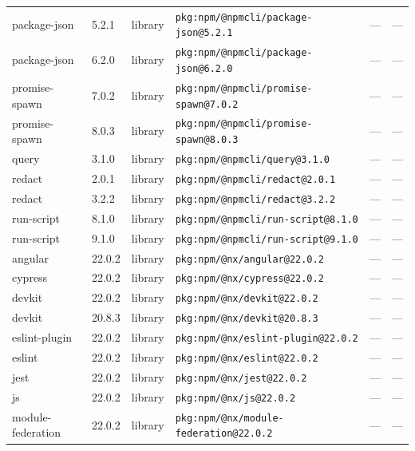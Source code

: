 \documentclass[11pt,a4paper]{article}
\begin{document}
\begin{longtable}{|p{4cm}|p{2cm}|p{1.6cm}|p{5cm}|p{1.5cm}|p{3.5cm}|}
\raggedright package-json & 5.2.1 & library & \small\texttt{pkg:npm/@npmcli/package-json@5.2.1} & — & \small — \\
\raggedright package-json & 6.2.0 & library & \small\texttt{pkg:npm/@npmcli/package-json@6.2.0} & — & \small — \\
\raggedright promise-spawn & 7.0.2 & library & \small\texttt{pkg:npm/@npmcli/promise-spawn@7.0.2} & — & \small — \\
\raggedright promise-spawn & 8.0.3 & library & \small\texttt{pkg:npm/@npmcli/promise-spawn@8.0.3} & — & \small — \\
\raggedright query & 3.1.0 & library & \small\texttt{pkg:npm/@npmcli/query@3.1.0} & — & \small — \\
\raggedright redact & 2.0.1 & library & \small\texttt{pkg:npm/@npmcli/redact@2.0.1} & — & \small — \\
\raggedright redact & 3.2.2 & library & \small\texttt{pkg:npm/@npmcli/redact@3.2.2} & — & \small — \\
\raggedright run-script & 8.1.0 & library & \small\texttt{pkg:npm/@npmcli/run-script@8.1.0} & — & \small — \\
\raggedright run-script & 9.1.0 & library & \small\texttt{pkg:npm/@npmcli/run-script@9.1.0} & — & \small — \\
\raggedright angular & 22.0.2 & library & \small\texttt{pkg:npm/@nx/angular@22.0.2} & — & \small — \\
\raggedright cypress & 22.0.2 & library & \small\texttt{pkg:npm/@nx/cypress@22.0.2} & — & \small — \\
\raggedright devkit & 22.0.2 & library & \small\texttt{pkg:npm/@nx/devkit@22.0.2} & — & \small — \\
\raggedright devkit & 20.8.3 & library & \small\texttt{pkg:npm/@nx/devkit@20.8.3} & — & \small — \\
\raggedright eslint-plugin & 22.0.2 & library & \small\texttt{pkg:npm/@nx/eslint-plugin@22.0.2} & — & \small — \\
\raggedright eslint & 22.0.2 & library & \small\texttt{pkg:npm/@nx/eslint@22.0.2} & — & \small — \\
\raggedright jest & 22.0.2 & library & \small\texttt{pkg:npm/@nx/jest@22.0.2} & — & \small — \\
\raggedright js & 22.0.2 & library & \small\texttt{pkg:npm/@nx/js@22.0.2} & — & \small — \\
\raggedright module-federation & 22.0.2 & library & \small\texttt{pkg:npm/@nx/module-federation@22.0.2} & — & \small — \\

\end{longtable}
\end{document}
